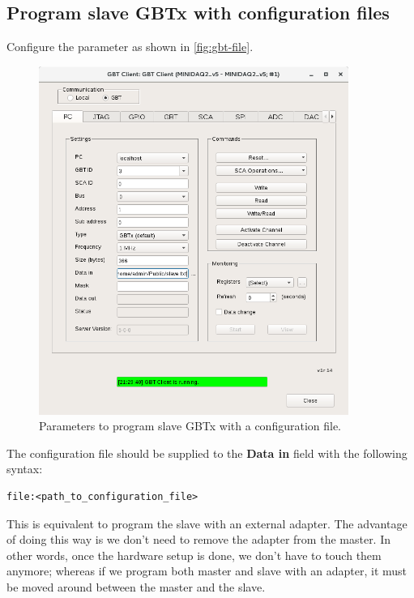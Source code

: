 \subsection{Program slave GBTx with configuration files}
Configure the parameter as shown in \autoref{fig:gbt-file}.

\begin{figure}[ht]
	\centering
    \includegraphics[width=0.9\textwidth]{res/gbt_client_slave_program_via_config_file.png}
	\caption{Parameters to program slave GBTx with a configuration file.}
	\label{fig:gbt-file}
\end{figure}

The configuration file should be supplied to the \textbf{Data in} field with the
following syntax:

\begin{minipage}{\textwidth}
\begin{lstlisting}
file:<path_to_configuration_file>
\end{lstlisting}
\end{minipage}

\begin{leftbar}
    This is equivalent to program the slave with an external \itwoc adapter.
    The advantage of doing this way is we don't need to remove the \itwoc
    adapter from the master.
    In other words, once the hardware setup is done, we don't have to touch them
    anymore; whereas if we program both master and slave with an \itwoc adapter,
    it must be moved around between the master and the slave.
\end{leftbar}
